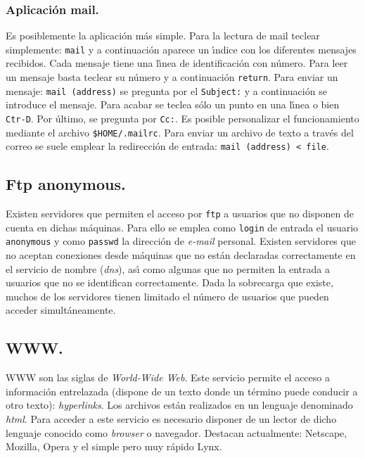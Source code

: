 \subsubsection{Aplicaci{\'o}n mail.}

Es posiblemente la aplicaci{\'o}n m{\'a}s simple. Para la lectura de mail
teclear simplemente: \verb+mail+ y a continuaci{\'o}n aparece un {\'\i}ndice
con los diferentes mensajes recibidos. Cada mensaje tiene una l{\'\i}nea de
identificaci{\'o}n con n{\'u}mero. Para leer un mensaje basta teclear su
n{\'u}mero y a continuaci{\'o}n \verb+return+. Para enviar un mensaje:
\verb+mail (address)+ se pregunta por el \verb+Subject:+ y a
continuaci{\'o}n se introduce el mensaje.  Para acabar se teclea s{\'o}lo un
punto en una l{\'\i}nea o bien \verb+Ctr-D+. Por {\'u}ltimo, se pregunta por
\verb+Cc:+. Es posible personalizar el funcionamiento mediante el
archivo {\tt \$HOME/.mailrc}. Para enviar un archivo de texto a trav{\'e}s del
correo se suele emplear la redirecci{\'o}n de entrada: 
\verb+mail (address) < file+.

\subsection{Ftp anonymous.} 

Existen servidores que permiten el acceso por \verb+ftp+ a usuarios
que no disponen de cuenta en dichas m{\'a}quinas. Para ello se emplea como
\verb+login+ de entrada el usuario \verb+anonymous+ y como
\verb+passwd+ la direcci{\'o}n de {\it e-mail} personal. Existen
servidores que no aceptan conexiones desde m{\'a}quinas que no est{\'a}n
declaradas correctamente en el servicio de nombre ({\it dns}), as{\'\i}
como algunas que no permiten la entrada a usuarios que no se
identifican correctamente.  Dada la sobrecarga que existe, muchos de
los servidores tienen limitado el n{\'u}mero de usuarios que pueden
acceder simult{\'a}neamente.

\subsection{WWW.}

WWW son las siglas de {\it World-Wide Web}. Este servicio permite el
acceso a informaci{\'o}n entrelazada (dispone de un texto donde un
t{\'e}rmino puede conducir a otro texto): {\it hyperlinks}. Los archivos est{\'a}n
realizados en un lenguaje denominado {\it html}. Para acceder a este
servicio es necesario disponer de un lector de dicho lenguaje conocido
como {\it browser} o navegador. Destacan actualmente: Netscape,
Mozilla, Opera y el simple pero muy r{\'a}pido Lynx.

